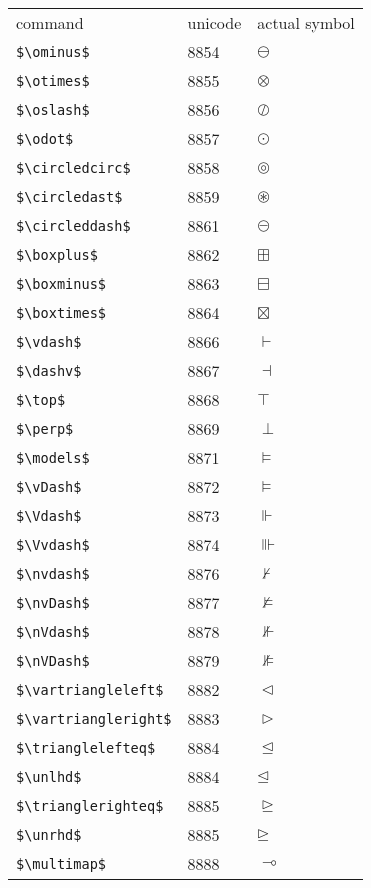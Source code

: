 \documentclass{article}
\begin{document}
\begin{table}
\begin{center}
\begin{tabular}{lll}
command & unicode & actual symbol\\
\verb#$\ominus$# & 8854 & $\ominus$\\ 
\verb#$\otimes$# & 8855 & $\otimes$\\ 
\verb#$\oslash$# & 8856 & $\oslash$\\ 
\verb#$\odot$# & 8857 & $\odot$\\ 
\verb#$\circledcirc$# & 8858 & $\circledcirc$\\ 
\verb#$\circledast$# & 8859 & $\circledast$\\ 
\verb#$\circleddash$# & 8861 & $\circleddash$\\ 
\verb#$\boxplus$# & 8862 & $\boxplus$\\ 
\verb#$\boxminus$# & 8863 & $\boxminus$\\ 
\verb#$\boxtimes$# & 8864 & $\boxtimes$\\ 
\verb#$\vdash$# & 8866 & $\vdash$\\ 
\verb#$\dashv$# & 8867 & $\dashv$\\ 
\verb#$\top$# & 8868 & $\top$\\ 
\verb#$\perp$# & 8869 & $\perp$\\ 
\verb#$\models$# & 8871 & $\models$\\ 
\verb#$\vDash$# & 8872 & $\vDash$\\ 
\verb#$\Vdash$# & 8873 & $\Vdash$\\ 
\verb#$\Vvdash$# & 8874 & $\Vvdash$\\ 
\verb#$\nvdash$# & 8876 & $\nvdash$\\ 
\verb#$\nvDash$# & 8877 & $\nvDash$\\ 
\verb#$\nVdash$# & 8878 & $\nVdash$\\ 
\verb#$\nVDash$# & 8879 & $\nVDash$\\ 
\verb#$\vartriangleleft$# & 8882 & $\vartriangleleft$\\ 
\verb#$\vartriangleright$# & 8883 & $\vartriangleright$\\ 
\verb#$\trianglelefteq$# & 8884 & $\trianglelefteq$\\ 
\verb#$\unlhd$# & 8884 & $\unlhd$\\ 
\verb#$\trianglerighteq$# & 8885 & $\trianglerighteq$\\ 
\verb#$\unrhd$# & 8885 & $\unrhd$\\ 
\verb#$\multimap$# & 8888 & $\multimap$\\ 

\end{tabular}
\end{center}
\end{table}
\end{document}
